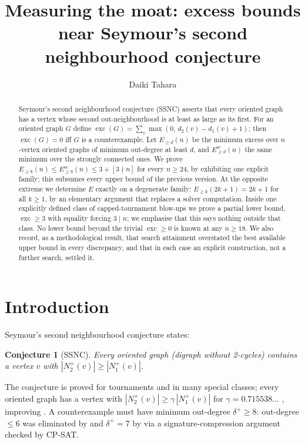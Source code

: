 \documentclass[11pt]{amsart}
\title[Measuring the moat]{Measuring the moat: excess bounds near
Seymour's second neighbourhood conjecture}
\author{Daiki Tahara}
\newtheorem{conjecture}[theorem]{Conjecture}
\theoremstyle{remark}
\newcommand{\exc}{\operatorname{exc}}
\newcommand{\Esc}{E^{\mathrm{sc}}}
\begin{document}
\begin{abstract}
Seymour's second neighbourhood conjecture (SSNC) asserts that every oriented
graph has a vertex whose second out-neighbourhood is at least as large as its
first. For an oriented graph $G$ define
$\exc(G) = \sum_v \max(0,\, d_2(v) - d_1(v) + 1)$; then $\exc(G) = 0$ iff $G$
is a counterexample. Let $E_{\ge d}(n)$ be the minimum excess over $n$-vertex
oriented graphs of minimum out-degree at least $d$, and $\Esc_{\ge d}(n)$
the same minimum over the strongly connected ones. We prove
$E_{\ge 8}(n) \le \Esc_{\ge 8}(n) \le 3 + [3 \nmid n]$ for every
$n \ge 24$, by exhibiting one explicit family; this subsumes every upper bound
of the previous version. At the opposite extreme we determine $E$ exactly on a
degenerate family: $E_{\ge k}(2k+1) = 2k+1$ for all $k \ge 1$, by an
elementary argument that replaces a solver computation. Inside one explicitly
defined class of capped-tournament blow-ups we prove a partial lower bound,
$\exc \ge 3$ with equality forcing $3 \mid n$; we emphasise that this says
nothing outside that class. No lower bound beyond the trivial $\exc \ge 0$
is known at any $n \ge 18$. We also
record, as a methodological result, that search attainment overstated the
best available upper bound in every discrepancy, and that in each case an
explicit construction, not a further search, settled it.
\end{abstract}

\maketitle

\section{Introduction}

Seymour's second neighbourhood conjecture \cite{DeanLatka1995} states:

\begin{conjecture}[SSNC]
Every oriented graph (digraph without 2-cycles) contains a vertex $v$ with
$|N_2^+(v)| \ge |N_1^+(v)|$.
\end{conjecture}

The conjecture is proved for tournaments \cite{Fisher1996,HavetThomasse2000}
and in many special classes; every oriented graph has a vertex with
$|N_2^+(v)| \ge \gamma\,|N_1^+(v)|$ for $\gamma = 0.715538\ldots$
\cite{HuangPeng2024}, improving \cite{ChenShenYuster2003}. A counterexample
must have minimum out-degree $\delta^+ \ge 8$: out-degree $\le 6$ was
eliminated by \cite{KanekoLocke2001} and $\delta^+ = 7$ by
\cite{SadhukhanSandeepSen2026} via a signature-compression argument checked by
CP-SAT.
\end{document}
